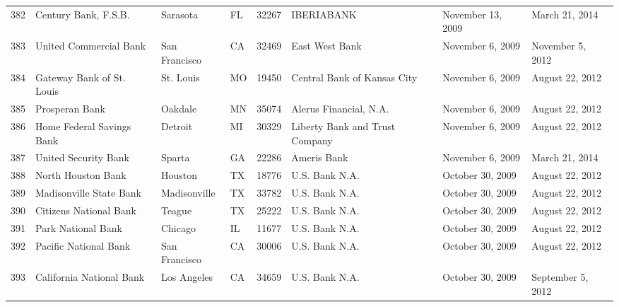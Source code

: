 \begin{tabular}{llllrlll}
382 &                               Century Bank, F.S.B. &            Sarasota &  FL &  32267 &                                         IBERIABANK &   November 13, 2009 &      March 21, 2014 \\
383 &                             United Commercial Bank &       San Francisco &  CA &  32469 &                                     East West Bank &    November 6, 2009 &    November 5, 2012 \\
384 &                          Gateway Bank of St. Louis &           St. Louis &  MO &  19450 &                        Central Bank of Kansas City &    November 6, 2009 &     August 22, 2012 \\
385 &                                     Prosperan Bank &             Oakdale &  MN &  35074 &                             Alerus Financial, N.A. &    November 6, 2009 &     August 22, 2012 \\
386 &                          Home Federal Savings Bank &             Detroit &  MI &  30329 &                     Liberty Bank and Trust Company &    November 6, 2009 &     August 22, 2012 \\
387 &                               United Security Bank &              Sparta &  GA &  22286 &                                        Ameris Bank &    November 6, 2009 &      March 21, 2014 \\
388 &                                 North Houston Bank &             Houston &  TX &  18776 &                                     U.S. Bank N.A. &    October 30, 2009 &     August 22, 2012 \\
389 &                            Madisonville State Bank &        Madisonville &  TX &  33782 &                                     U.S. Bank N.A. &    October 30, 2009 &     August 22, 2012 \\
390 &                             Citizens National Bank &              Teague &  TX &  25222 &                                     U.S. Bank N.A. &    October 30, 2009 &     August 22, 2012 \\
391 &                                 Park National Bank &             Chicago &  IL &  11677 &                                     U.S. Bank N.A. &    October 30, 2009 &     August 22, 2012 \\
392 &                              Pacific National Bank &       San Francisco &  CA &  30006 &                                     U.S. Bank N.A. &    October 30, 2009 &     August 22, 2012 \\
393 &                           California National Bank &         Los Angeles &  CA &  34659 &                                     U.S. Bank N.A. &    October 30, 2009 &   September 5, 2012 \\

\end{tabular}
